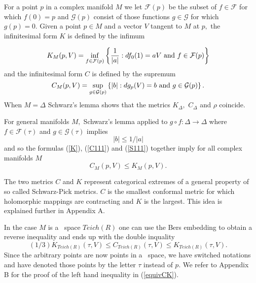 \documentclass[12pt]{amsart}
\theoremstyle{remark}
\theoremstyle{definition}
\theoremstyle{definition}
\begin{document}
\begin{section}
For a point $p$ in a complex manifold $M$ we let  
${\mathcal F}({p})$ be the subset of $f \in {\mathcal F}$ for which $f(0)={p}$ and  
 ${\mathcal G}(p)$ consist of those functions $g \in {\mathcal G}$ for which $g({p})=0.$  Given a point $p \in M$ and a vector $V$ tangent to $M$ at $p,$ the infinitesimal form $K$ is  defined by the infimum  

 \begin{equation}\label{K}
 K_M(p,V) = \inf_{ f \in {\mathcal F(p)}} \left\{ \frac{1}{|a|}:  df_0(1)=a V {\rm \ and \ } f \in {\mathcal F}(p)\right\}  
 \end{equation}
and the infinitesimal form $C$ is defined by the supremum 
 \begin{equation}\label{C111}
 C_M(p,V) = \sup_{ g \in {\mathcal G(p)}} \left\{|b|:  dg_p(V)=b {\rm \ and \ } g \in {\mathcal G}(p)\right\}.
 \end{equation}
 When $M=\Delta$  Schwarz's lemma shows that the metrics $K_{\Delta},$ $C_{\Delta}$ and  $\rho$ coincide.   
       
          
 
 
   For general manifolds $M,$ Schwarz's lemma applied to $g \circ f : \Delta \rightarrow \Delta$ where  $f \in {\mathcal F}(\tau)$ and $g \in {\mathcal G}(\tau)$ implies 
 \begin{equation}\label{S111}|b| \leq 1/|a| 
 \end{equation}
 and so the formulas (\ref{K}), (\ref{C111}) and (\ref{S111}) together imply  for all 
 complex manifolds $M$
 \begin{equation}\label{C<K}
 C_M(p,V) \leq K_M(p,V).
 \end{equation}
 
 The two metrics $C$ and $K$ represent categorical extremes of a general property of so called Schwarz-Pick metrics.  $C$ is the smallest conformal metric for which holomorphic mappings are contracting and $K$ is the largest.  This idea is explained further in Appendix A.
 
 
   In the case $M$ is  a \te\ space $Teich(R)$ one can use the Bers embedding  \cite{Ahlforsbook5, Bers11} to obtain a reverse inequality and ends up with the double inquality
    \begin{equation}\label{equivCK}
 (1/3) K_{Teich(R)}(\tau,V) \leq C_{Teich(R)}(\tau,V) \leq K_{Teich(R)}(\tau,V).
 \end{equation}
 Since the arbitrary points are now points in a \te\ space, we have switched notations and have denoted those points  by the letter  $\tau$ instead of $p.$  We refer to Appendix B for the proof of the left hand inequality in  (\ref{equivCK}).
 

\end{section}
\end{document}
